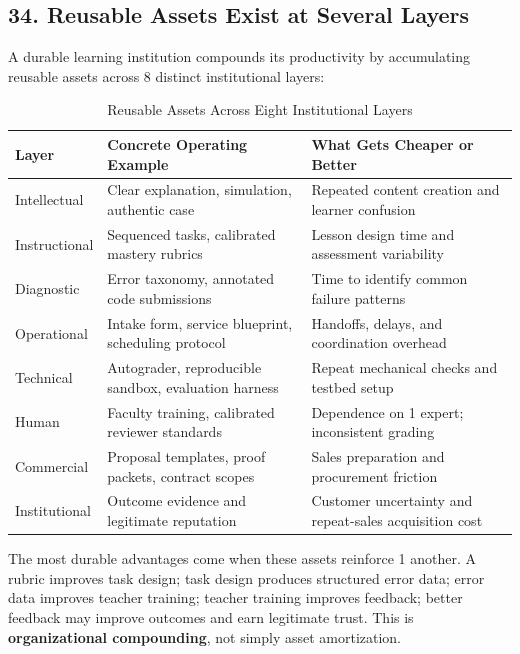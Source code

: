 \subsection*{34. Reusable Assets Exist at Several Layers}

A durable learning institution compounds its productivity by accumulating reusable assets across 8 distinct institutional layers:

\begin{table}[t]
\centering
\small
\caption{Reusable Assets Across Eight Institutional Layers}
\begin{tabularx}{\textwidth}{p{}p{}X}
\toprule
\textbf{Layer} & \textbf{Concrete Operating Example} & \textbf{What Gets Cheaper or Better} \\
\midrule
Intellectual & Clear explanation, simulation, authentic case & Repeated content creation and learner confusion \\
Instructional & Sequenced tasks, calibrated mastery rubrics & Lesson design time and assessment variability \\
Diagnostic & Error taxonomy, annotated code submissions & Time to identify common failure patterns \\
Operational & Intake form, service blueprint, scheduling protocol & Handoffs, delays, and coordination overhead \\
Technical & Autograder, reproducible sandbox, evaluation harness & Repeat mechanical checks and testbed setup \\
Human & Faculty training, calibrated reviewer standards & Dependence on 1 expert; inconsistent grading \\
Commercial & Proposal templates, proof packets, contract scopes & Sales preparation and procurement friction \\
Institutional & Outcome evidence and legitimate reputation & Customer uncertainty and repeat-sales acquisition cost \\
\bottomrule
\end{tabularx}
\end{table}

The most durable advantages come when these assets reinforce 1 another. A rubric improves task design; task design produces structured error data; error data improves teacher training; teacher training improves feedback; better feedback may improve outcomes and earn legitimate trust. This is \textbf{organizational compounding}, not simply asset amortization.

